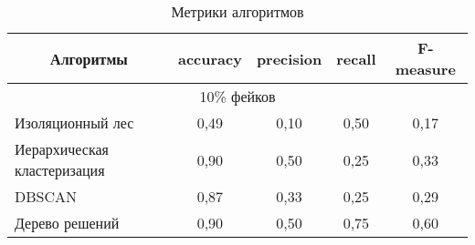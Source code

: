 \begin{table}[H]
    \caption{Метрики алгоритмов}
    \vspace{1em}
    \small
    \begin{tabular}{|lllll|}
    \hline
    \multicolumn{1}{|c|}{\textbf{Алгоритмы}}          & \multicolumn{1}{c|}{\textbf{accuracy}} & \multicolumn{1}{c|}{\textbf{precision}} & \multicolumn{1}{c|}{\textbf{recall}} & \multicolumn{1}{c|}{\textbf{F-measure}} \\ \hline
    

    
    \multicolumn{5}{|c|}{10\% фейков} \\ \hline
    \multicolumn{1}{|l|}{Изоляционный лес} & \multicolumn{1}{c|}{0,49} & \multicolumn{1}{c|}{0,10} & \multicolumn{1}{c|}{0,50} & \multicolumn{1}{c|}{0,17}     \\ \hline
    
    \multicolumn{1}{|l|}{Иерархическая кластеризация} & \multicolumn{1}{c|}{0,90} & \multicolumn{1}{c|}{0,50} & \multicolumn{1}{c|}{0,25} &  \multicolumn{1}{c|}{0,33} \\ \hline
    
    \multicolumn{1}{|l|}{DBSCAN} & \multicolumn{1}{c|}{0,87} & \multicolumn{1}{c|}{0,33} & \multicolumn{1}{c|}{0,25} & \multicolumn{1}{c|}{0,29} \\ \hline

    \multicolumn{1}{|l|}{Дерево решений} & \multicolumn{1}{c|}{0,90} & \multicolumn{1}{c|}{0,50} & \multicolumn{1}{c|}{0,75} & \multicolumn{1}{c|}{0,60} \\ \hline
    

\end{tabular}
\end{table}
